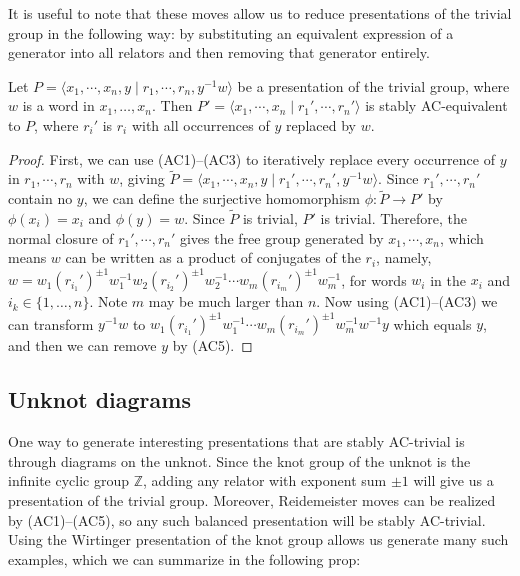 It is useful to note that these moves allow us to reduce presentations of the trivial group in the following way: by substituting an equivalent expression of a generator into all relators and then removing that generator entirely.
\begin{lemma}[Substitution]
    \label{lem:substitution}
    Let $P=\langle x_1,\cdots, x_n, y \mid r_1,\cdots, r_n, y^{-1}w\rangle$ be a presentation of the trivial group, where $w$ is a word in $x_1,\ldots,x_n$. Then $P'=\langle x_1,\cdots, x_n \mid r_1',\cdots, r_n'\rangle$ is stably AC-equivalent to $P$, where $r_i'$ is $r_i$ with all occurrences of $y$ replaced by $w$.
\end{lemma}
\begin{proof}
    First, we can use (AC1)--(AC3) to iteratively replace every occurrence of $y$ in $r_1,\cdots,r_n$ with $w$, giving $\widetilde{P}=\langle x_1,\cdots,x_n,y\mid r_1',\cdots,r_n',y^{-1}w\rangle$. Since $r_1',\cdots,r_n'$ contain no $y$, we can define the surjective homomorphism $\phi:\widetilde{P}\longrightarrow P'$ by $\phi(x_i)=x_i$ and $\phi(y)=w$. Since $\widetilde{P}$ is trivial, $P'$ is trivial. Therefore, the normal closure of $r_1',\cdots, r_n'$ gives the free group generated by $x_1,\cdots, x_n$, which means $w$ can be written as a product of conjugates of the $r_i$, namely, $w=w_1 (r_{i_1}')^{\pm1}w_1^{-1}w_2 (r_{i_2}')^{\pm 1}w_2^{-1}\cdots w_m (r_{i_m}')^{\pm 1}w_m^{-1}$, for words $w_i$ in the $x_i$ and $i_k \in \{1,\ldots,n\}$. Note $m$ may be much larger than $n$. Now using (AC1)--(AC3) we can transform  $y^{-1}w$ to $w_1 (r_{i_1}')^{\pm1}w_1^{-1}\cdots w_m (r_{i_m}')^{\pm 1}w_m^{-1}w^{-1}y$ which equals $y$, and then we can remove $y$ by (AC5).
\end{proof}

\subsection{Unknot diagrams}

One way to generate interesting presentations that are stably AC-trivial is through diagrams on the unknot. Since the knot group of the unknot is the infinite cyclic group $\mathbb{Z}$, adding any relator with exponent sum $\pm 1$ will give us a presentation of the trivial group. Moreover, Reidemeister moves can be realized by (AC1)--(AC5), so any such balanced presentation will be stably AC-trivial. Using the Wirtinger presentation of the knot group allows us generate many such examples, which we can summarize in the following prop:

